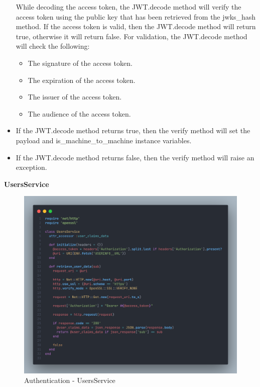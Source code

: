 \begin{justify}
\begin{itemize}
                \vspace{0.25cm}
                \newendline While decoding the access token, the JWT.decode method will verify the access token using the public key that has been retrieved from the jwks\_hash method. If the access token is valid, then the JWT.decode method will return true, otherwise it will return false. For validation, the JWT.decode method will check the following:
                    \begin{itemize}
                        \item The signature of the access token.
                        \item The expiration of the access token.
                        \item The issuer of the access token.
                        \item The audience of the access token.
                    \end{itemize}

                \item If the JWT.decode method returns true, then the verify method will set the payload and is\_machine\_to\_machine instance variables.
                \item If the JWT.decode method returns false, then the verify method will raise an exception.\\
            \end{itemize}

        \clearpage
        \noindent \textbf{UsersService}
        
        \begin{figure}[H]
            \centerline{\includegraphics[width=150mm,scale=1]{figures/implementation_and_testing/implementation/backend/UsersService.png}}
            \caption{Authentication - UsersService}
        \end{figure}
        

\end{justify}
